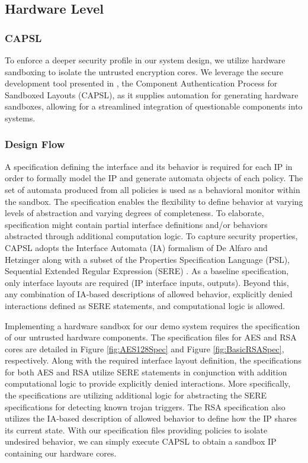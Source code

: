 \documentclass[sigconf]{acmart}
\theoremstyle{plain}
\theoremstyle{remark}
\begin{document}
\subsection{Hardware Level}


\subsubsection{CAPSL}

To enforce a deeper security profile in our system design, we utilize hardware sandboxing to isolate the untrusted encryption cores. We leverage the secure development tool presented in \cite{CAPSL}, the Component Authentication Process for Sandboxed Layouts (CAPSL), as it supplies automation for generating hardware sandboxes, allowing for a streamlined integration of questionable components into systems.

\subsubsection{Design Flow}

A specification defining the interface and its behavior is required for each IP in order to formally model the IP and generate automata objects of each policy. The set of automata produced from all policies is used as a behavioral monitor within the sandbox. The specification enables the flexibility to define behavior at varying levels of abstraction and varying degrees of completeness. To elaborate, specification might contain partial interface definitions and/or behaviors abstracted through additional computation logic. To capture security properties, CAPSL adopts the Interface Automata (IA) formalism of De Alfaro and Hetzinger \cite{deAlfaro} along with a subset of the Properties Specification Language (PSL), Sequential Extended Regular Expression (SERE) \cite{psl}. As a baseline specification, only interface layouts are required (IP interface inputs, outputs). Beyond this, any combination of IA-based descriptions of allowed behavior, explicitly denied interactions defined as SERE statements, and computational logic is allowed.


Implementing a hardware sandbox for our demo system requires the specification of our untrusted hardware components. The specification files for AES and RSA cores are detailed in Figure \ref{fig:AES128Spec} and Figure \ref{fig:BasicRSASpec}, respectively. Along with the required interface layout definition, the specifications for both AES and RSA utilize SERE statements in conjunction with addition computational logic to provide explicitly denied interactions. More specifically, the specifications are utilizing additional logic for abstracting the SERE specifications for detecting known trojan triggers. The RSA specification also utilizes the IA-based description of allowed behavior to define how the IP shares its current state. With our specification files providing policies to isolate undesired behavior, we can simply execute CAPSL to obtain a sandbox IP containing our hardware cores.
\end{document}
